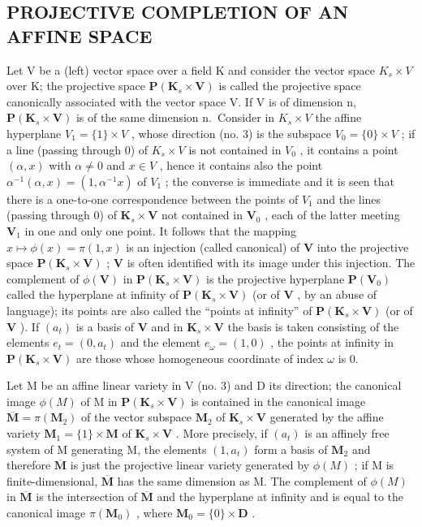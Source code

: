 \subsection{PROJECTIVE COMPLETION OF AN AFFINE SPACE}

Let V be a (left) vector space over a field K and consider the vector space \(K_{s} \times V\) over K; the projective space \(\mathbf{P}(\mathbf{K}_{s} \times \mathbf{V})\) is called the projective space canonically associated with the vector space V. If V is of dimension n, \(\mathbf{P}(\mathbf{K}_{s} \times \mathbf{V})\) is of the same dimension n.~Consider in \(K_{s} \times V\) the affine hyperplane \(V_{1} = \{1\} \times V\) , whose direction (no. 3) is the subspace \(V_{0} = \{0\} \times V\) ; if a line (passing through 0) of \(K_{s} \times V\) is not contained in \(V_{0}\) , it contains a point \((\alpha, x)\) with \(\alpha \neq 0\) and \(x \in V\) , hence it contains also the point \(\alpha^{-1}(\alpha, x) = (1, \alpha^{-1}x)\) of \(V_{1}\) ; the converse is immediate and it is seen that there is a one-to-one correspondence between the points of \(V_{1}\) and the lines (passing through 0) of \(\mathbf{K}_s \times \mathbf{V}\) not contained in \(\mathbf{V}_0\) , each of the latter meeting \(\mathbf{V}_1\) in one and only one point. It follows that the mapping \(x \mapsto \phi(x) = \pi(1, x)\) is an injection (called canonical) of \(\mathbf{V}\) into the projective space \(\mathbf{P}(\mathbf{K}_s \times \mathbf{V})\) ; \(\mathbf{V}\) is often identified with its image under this injection. The complement of \(\phi(\mathbf{V})\) in \(\mathbf{P}(\mathbf{K}_s \times \mathbf{V})\) is the projective hyperplane \(\mathbf{P}(\mathbf{V}_0)\) called the hyperplane at infinity of \(\mathbf{P}(\mathbf{K}_s \times \mathbf{V})\) (or of \(\mathbf{V}\) , by an abuse of language); its points are also called the ``points at infinity'' of \(\mathbf{P}(\mathbf{K}_s \times \mathbf{V})\) (or of \(\mathbf{V}\) ). If \((a_t)\) is a basis of \(\mathbf{V}\) and in \(\mathbf{K}_s \times \mathbf{V}\) the basis is taken consisting of the elements \(e_t = (0, a_t)\) and the element \(e_\omega = (1, 0)\) , the points at infinity in \(\mathbf{P}(\mathbf{K}_s \times \mathbf{V})\) are those whose homogeneous coordinate of index \(\omega\) is 0.

Let M be an affine linear variety in V (no. 3) and D its direction; the canonical image \(\phi(M)\) of M in \(\mathbf{P}(\mathbf{K}_s \times \mathbf{V})\) is contained in the canonical image \(\overline{\mathbf{M}} = \pi(\mathbf{M}_2)\) of the vector subspace \(\mathbf{M}_2\) of \(\mathbf{K}_s \times \mathbf{V}\) generated by the affine variety \(\mathbf{M}_1 = \{1\} \times \mathbf{M}\) of \(\mathbf{K}_s \times \mathbf{V}\) . More precisely, if \((a_t)\) is an affinely free system of M generating M, the elements \((1, a_t)\) form a basis of \(\mathbf{M}_2\) and therefore \(\overline{\mathbf{M}}\) is just the projective linear variety generated by \(\phi(M)\) ; if M is finite-dimensional, \(\overline{\mathbf{M}}\) has the same dimension as M. The complement of \(\phi(M)\) in \(\overline{\mathbf{M}}\) is the intersection of \(\overline{\mathbf{M}}\) and the hyperplane at infinity and is equal to the canonical image \(\pi(\mathbf{M}_0)\) , where \(\mathbf{M}_0 = \{0\} \times \mathbf{D}\) .

